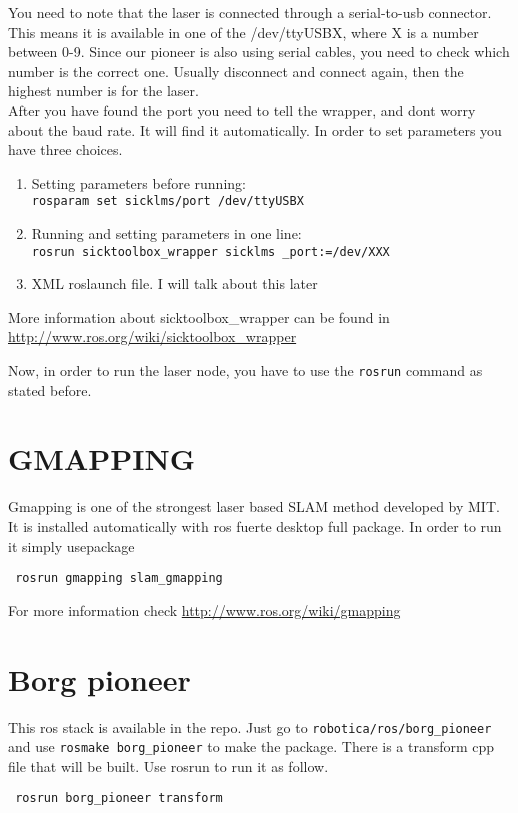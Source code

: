 \documentclass[a4paper, 12pt, oneside]{report}
\begin{document}
You need to note that the laser is connected through a serial-to-usb connector. This means it is available in one of the /dev/ttyUSBX, where X is 
a number between 0-9. Since our pioneer is also using serial cables, you need to check which number is the correct one. Usually disconnect and 
connect again, then the highest number is for the laser.\\

After you have found the port you need to tell the wrapper, and dont worry about the baud rate. It will find it automatically.
In order to set parameters you have three choices. 

\begin{enumerate}
 \item Setting parameters before running: \\
 \verb|rosparam set sicklms/port /dev/ttyUSBX|
 \item Running and setting parameters in one line:\\
 \verb|rosrun sicktoolbox_wrapper sicklms _port:=/dev/XXX |
 \item XML roslaunch file. I will talk about this later
\end{enumerate}


More information about sicktoolbox\_wrapper can be found in \url{http://www.ros.org/wiki/sicktoolbox_wrapper}

Now, in order to run the laser node, you have to use the \verb|rosrun| command as stated before. 	

\section{GMAPPING}
Gmapping is one of the strongest laser based SLAM method developed by MIT. It is installed automatically with ros fuerte desktop full package.
In order to run it simply usepackage
\begin{verbatim}
 rosrun gmapping slam_gmapping
\end{verbatim}

For more information check \url{http://www.ros.org/wiki/gmapping}

\section{Borg pioneer}
This ros stack is available in the repo. Just go to \verb|robotica/ros/borg_pioneer| and use \verb|rosmake borg_pioneer| to make the package.
There is a transform cpp file that will be built. Use rosrun to run it as follow.
\begin{verbatim}
 rosrun borg_pioneer transform
\end{verbatim}
\end{document}
